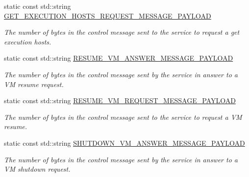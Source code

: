 \begin{DoxyCompactItemize}
static const std\+::string \hyperlink{classwrench_1_1_cloud_service_message_payload_a0c4ac7c65733155c7819d9c2b0528939}{G\+E\+T\+\_\+\+E\+X\+E\+C\+U\+T\+I\+O\+N\+\_\+\+H\+O\+S\+T\+S\+\_\+\+R\+E\+Q\+U\+E\+S\+T\+\_\+\+M\+E\+S\+S\+A\+G\+E\+\_\+\+P\+A\+Y\+L\+O\+AD}
\begin{DoxyCompactList}\small\item\em The number of bytes in the control message sent to the service to request a get execution hosts. \end{DoxyCompactList}\item 
\mbox{\label{classwrench_1_1_cloud_service_message_payload_a79c5699f69b6fb6b2d0ae7a3ebcb3301}} 
static const std\+::string \hyperlink{classwrench_1_1_cloud_service_message_payload_a79c5699f69b6fb6b2d0ae7a3ebcb3301}{R\+E\+S\+U\+M\+E\+\_\+\+V\+M\+\_\+\+A\+N\+S\+W\+E\+R\+\_\+\+M\+E\+S\+S\+A\+G\+E\+\_\+\+P\+A\+Y\+L\+O\+AD}
\begin{DoxyCompactList}\small\item\em The number of bytes in the control message sent by the service in answer to a VM resume request. \end{DoxyCompactList}\item 
\mbox{\label{classwrench_1_1_cloud_service_message_payload_a18dbfc17cec5bf71e60a7b27e36024d7}} 
static const std\+::string \hyperlink{classwrench_1_1_cloud_service_message_payload_a18dbfc17cec5bf71e60a7b27e36024d7}{R\+E\+S\+U\+M\+E\+\_\+\+V\+M\+\_\+\+R\+E\+Q\+U\+E\+S\+T\+\_\+\+M\+E\+S\+S\+A\+G\+E\+\_\+\+P\+A\+Y\+L\+O\+AD}
\begin{DoxyCompactList}\small\item\em The number of bytes in the control message sent to the service to request a VM resume. \end{DoxyCompactList}\item 
\mbox{\label{classwrench_1_1_cloud_service_message_payload_aa4788e4c91a26be675bfa29e827f529a}} 
static const std\+::string \hyperlink{classwrench_1_1_cloud_service_message_payload_aa4788e4c91a26be675bfa29e827f529a}{S\+H\+U\+T\+D\+O\+W\+N\+\_\+\+V\+M\+\_\+\+A\+N\+S\+W\+E\+R\+\_\+\+M\+E\+S\+S\+A\+G\+E\+\_\+\+P\+A\+Y\+L\+O\+AD}
\begin{DoxyCompactList}\small\item\em The number of bytes in the control message sent by the service in answer to a VM shutdown request. \end{DoxyCompactList}\item 

\end{DoxyCompactItemize}

